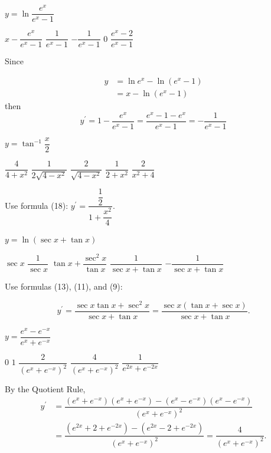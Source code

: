 \newpage


\question
$y=\ln \dfrac{e^{x}}{e^{x}-1}$
\begin{choices}
  \choice $x-\dfrac{e^{x}}{e^{x}-1}$
  \choice $\dfrac{1}{e^{x}-1}$
  \CorrectChoice $-\dfrac{1}{e^{x}-1}$
  \choice $0$
  \choice $\dfrac{e^{x}-2}{e^{x}-1}$
\end{choices}
\begin{solution}
Since


\[
\begin{aligned}
y & =\ln e^{x}-\ln \left(e^{x}-1\right) \\
& =x-\ln \left(e^{x}-1\right)
\end{aligned}
\]
then
\[
y^{\prime}=1-\dfrac{e^{x}}{e^{x}-1}=\dfrac{e^{x}-1-e^{x}}{e^{x}-1}=-\dfrac{1}{e^{x}-1}
\]
\end{solution}

\question
$y=\tan ^{-1} \dfrac{x}{2}$
\begin{choices}
  \choice $\dfrac{4}{4+x^{2}}$
  \choice $\dfrac{1}{2 \sqrt{4-x^{2}}}$
  \choice $\dfrac{2}{\sqrt{4-x^{2}}}$
  \choice $\dfrac{1}{2+x^{2}}$
  \CorrectChoice $\dfrac{2}{x^{2}+4}$
\end{choices}
\begin{solution}
Use formula (18): $y^{\prime}=\dfrac{\dfrac{1}{2}}{1+\dfrac{x^{2}}{4}}$.
\end{solution}


\newpage


\question
$y=\ln (\sec x+\tan x)$
\begin{choices}
  \CorrectChoice $\sec x$
  \choice $\dfrac{1}{\sec x}$
  \choice $\tan x+\dfrac{\sec ^{2} x}{\tan x}$
  \choice $\dfrac{1}{\sec x+\tan x}$
  \choice $-\dfrac{1}{\sec x+\tan x}$
\end{choices}
\begin{solution}
Use formulas (13), (11), and (9):


\[
y^{\prime}=\dfrac{\sec x \tan x+\sec ^{2} x}{\sec x+\tan x}=\dfrac{\sec x(\tan x+\sec x)}{\sec x+\tan x} .
\]


\end{solution}

\question
$y=\dfrac{e^{x}-e^{-x}}{e^{x}+e^{-x}}$
\begin{choices}
  \choice $0$
  \choice $1$
  \choice $\dfrac{2}{\left(e^{x}+e^{-x}\right)^{2}}$
  \CorrectChoice $\dfrac{4}{\left(e^{x}+e^{-x}\right)^{2}}$
  \choice $\dfrac{1}{e^{2 x}+e^{-2 x}}$
\end{choices}
\begin{solution}
By the Quotient Rule,
\[
\begin{aligned}
y^{\prime} & =\dfrac{\left(e^{x}+e^{-x}\right)\left(e^{x}+e^{-x}\right)-\left(e^{x}-e^{-x}\right)\left(e^{x}-e^{-x}\right)}{\left(e^{x}+e^{-x}\right)^{2}} \\
& =\dfrac{\left(e^{2 x}+2+e^{-2 x}\right)-\left(e^{2 x}-2+e^{-2 x}\right)}{\left(e^{x}+e^{-x}\right)^{2}}=\dfrac{4}{\left(e^{x}+e^{-x}\right)^{2}} .
\end{aligned}
\]
\end{solution}


